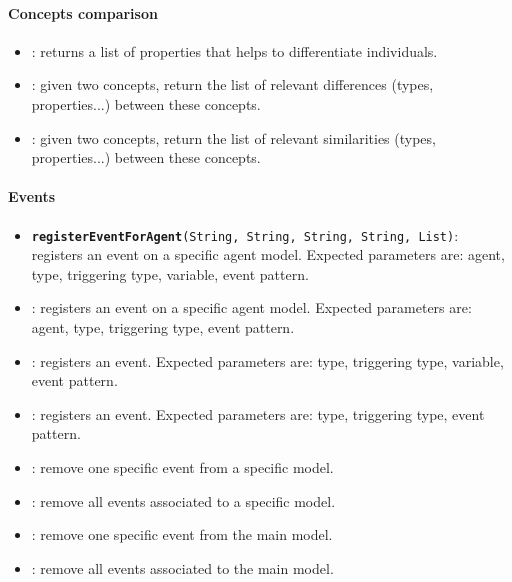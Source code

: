 \paragraph{Concepts comparison}
\begin{itemize}

    \item {}: returns a list of properties that
    helps to differentiate individuals.

    \item {}: given two concepts,
    return the list of relevant differences (types, properties...) between
    these concepts.

    \item {}: given two concepts,
    return the list of relevant similarities (types, properties...) between
    these concepts.
\end{itemize}

\paragraph{Events}
\begin{itemize}

    \item {\tt {\bf registerEventForAgent}(String, String, String, String,
    List)}: registers an event on a specific agent model. Expected parameters
    are: agent, type, triggering type, variable, event pattern.

    \item {}:
    registers an event on a specific agent model. Expected parameters are:
    agent, type, triggering type, event pattern.

    \item {}: registers an
    event. Expected parameters are: type, triggering type, variable, event
    pattern.

    \item {}: registers an event.
    Expected parameters are: type, triggering type, event pattern.

    \item {}: remove one specific event
    from a specific model.

    \item {}: remove all events associated
    to a specific model.

    \item {}: remove one specific event from the
    main model.

    \item {}: remove all events associated to the main
    model.
\end{itemize}

